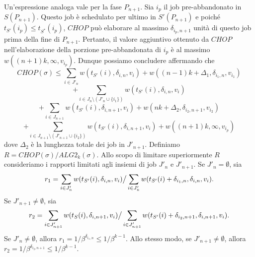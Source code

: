\documentclass[12pt]{article}
\begin{document}
Un'espressione analoga vale per la fase $P_{n + 1}$. Sia $i_{p}$ il job pre-abbandonato in $S(P_{n + 1})$. Questo job è schedulato per ultimo in $S'(P_{n + 1})$ e poiché $t_{S'}(i_{p}) \leq t_{S^{*}} (i_{p})$, $CHOP$ può elaborare al massimo $\delta_{i_{p}, n+1}$ unità di questo job prima della fine di $P_{n + 1}$. Pertanto, il valore aggiuntivo ottenuto da $CHOP$ nell'elaborazione della porzione pre-abbandonata di $i_{p}$ è al massimo $w ((n + 1) k, \infty,v_{i_{p}}).$ Dunque possiamo concludere affermando che
\begin{equation}
CHOP(\sigma) \leq \sum_{i \in J'_{n}} w (t_{S'}(i), \delta_{i,n},v_{i}) + w ((n - 1) k + \Delta_{1}, \delta_{i_{1},n}, v_{i_{1}}) \tag*{(6)}
\end{equation}
$$+ \sum_{i\in J_{n} \setminus (J'_{n}\cup \{i_{1}\})} w(t_{S'}(i), \delta_{i,n},v_{i})$$
\begin{equation}
+ \sum_{i \in J_{n+1}}w (t_{S'} (i), \delta_{i,n + 1},v_{i}) + w (nk + \Delta_{2}, \delta_{i_{2}, n+1}, v_{i_{2}})\tag*{(7)}
\end{equation}
\begin{equation}
+ \sum_{i \in J_{n+1} \setminus (J'_{n+1} \cup \{i_{2}\})} w (t_{S'} (i), \delta_{i,n+1}, v_{i}) + w ((n + 1) k, \infty, v_{i_{p}}) \tag*{(8)}
\end{equation}
dove $\Delta_{2}$ è la lunghezza totale dei job in $J'_{n+1}$. Definiamo $R = CHOP(\sigma) / ALG2_{k} (\sigma).$ Allo scopo di limitare superiormente $R$ consideriamo i rapporti limitati agli insiemi di job $J'_{n}$ e $J'_{n+1}$. Se $J'_{n} = \emptyset$, sia
$$r_{1} = \sum_{i\in J'_{n}} w(t_{S'}(i), \delta_{i,n}, v_{i}) \big{/} \sum_{i \in J'_{n}} w (t_{S'}(i) + \delta_{i_{1},n}, \delta_{i,n}, v_{i}).$$
Se $J'_{n+1} \neq \emptyset$, sia
$$r_{2} = \sum_{i \in J'_{n+1}} w (t_{S} (i), \delta_{i,n+1}, v_{i}) \big{/} \sum_{i \in J'_{n+1}} w (t_{S'} (i) + \delta_{i_{2}, n+1}, \delta_{i,n+1}, v_{i}).$$
Se $J'_{n} \neq \emptyset$, allora $r_{1} = 1 / \beta^{\delta_{i_{1},n}} \leq 1 / \beta^{k-1}$. Allo stesso modo, se $J'_{n+1} \neq \emptyset$, allora $r_{2} = 1 / \beta^{\delta_{i_{2}, n+1}} \leq 1 / \beta^{k-1}$.
\end{document}
